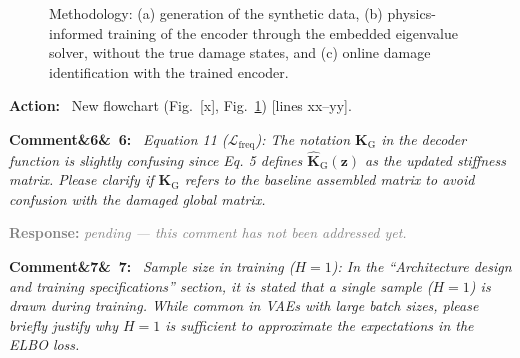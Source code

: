 \documentclass[11pt]{article}
\newenvironment{rcomment}[1]{\par\bigskip\noindent\textbf{Comment\ifx&#1&\else\ #1\fi:}\ \itshape}{\par}
\newenvironment{action}{\par\smallskip\noindent\color{resp}\textbf{Action:}\ }{\par}
\newcommand{\pending}{\par\smallskip\noindent\textcolor{gray}{\textbf{Response:} \textit{pending --- this comment
has not been addressed yet.}}\par}
\newcommand{\tbd}[1]{\textcolor{note}{\textsf{[#1]}}}
\newcommand{\lines}[1]{\tbd{lines #1}}
\newcommand{\m}{\mathbf{m}}
\newcommand{\z}{\mathbf{z}}
\begin{document}
\begin{figure}[H]
\caption{Methodology: (a) generation of the synthetic data, (b) physics-informed training of the encoder through the embedded eigenvalue solver, without the true damage states, and (c) online damage identification with the trained encoder.}
\label{fig:flowchart}
\end{figure}

\begin{action}
New flowchart (Fig.~\tbd{x}, Fig.~\ref{fig:flowchart}) \lines{xx--yy}.
\end{action}

\begin{rcomment}{6}
Equation 11 ($\mathcal{L}_{\mathrm{freq}}$): The notation $\mathbf{K}_{\mathrm{G}}$ in the decoder function is slightly
confusing since Eq. 5 defines $\hat{\mathbf{K}}_{\mathrm{G}}(\z)$ as the updated stiffness matrix. Please clarify if
$\mathbf{K}_{\mathrm{G}}$ refers to the baseline assembled matrix to avoid confusion with the damaged global matrix.
\end{rcomment}
\pending

\begin{rcomment}{7}
Sample size in training ($H=1$): In the ``Architecture design and training specifications'' section, it is stated that
a single sample ($H=1$) is drawn during training. While common in VAEs with large batch sizes, please briefly justify why
$H=1$ is sufficient to approximate the expectations in the ELBO loss.
\end{rcomment}
\end{document}

